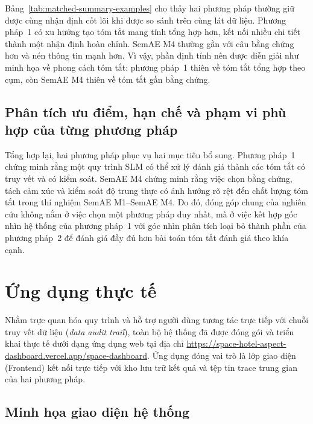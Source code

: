 Bảng~\ref{tab:matched-summary-examples} cho thấy hai phương pháp thường giữ được cùng nhận định cốt lõi khi được so sánh trên cùng lát dữ liệu. Phương pháp~1 có xu hướng tạo tóm tắt mang tính tổng hợp hơn, kết nối nhiều chi tiết thành một nhận định hoàn chỉnh. SemAE M4 thường gần với câu bằng chứng hơn và nén thông tin mạnh hơn. Vì vậy, phần định tính nên được diễn giải như minh họa về phong cách tóm tắt: phương pháp~1 thiên về tóm tắt tổng hợp theo cụm, còn SemAE M4 thiên về tóm tắt gần bằng chứng.

\FloatBarrier

\subsection{Phân tích ưu điểm, hạn chế và phạm vi phù hợp của từng phương pháp}

Tổng hợp lại, hai phương pháp phục vụ hai mục tiêu bổ sung. Phương pháp~1 chứng minh rằng một quy trình SLM có thể xử lý đánh giá thành các tóm tắt có truy vết và có kiểm soát. SemAE M4 chứng minh rằng việc chọn bằng chứng, tách cảm xúc và kiểm soát độ trung thực có ảnh hưởng rõ rệt đến chất lượng tóm tắt trong thí nghiệm SemAE M1--SemAE M4. Do đó, đóng góp chung của nghiên cứu không nằm ở việc chọn một phương pháp duy nhất, mà ở việc kết hợp góc nhìn hệ thống của phương pháp~1 với góc nhìn phân tích loại bỏ thành phần của phương pháp~2 để đánh giá đầy đủ hơn bài toán tóm tắt đánh giá theo khía cạnh.

\section{Ứng dụng thực tế}
\label{sec:web-interface}

Nhằm trực quan hóa quy trình và hỗ trợ người dùng tương tác trực tiếp với chuỗi truy vết dữ liệu (\textit{data audit trail}), toàn bộ hệ thống đã được đóng gói và triển khai thực tế dưới dạng ứng dụng web tại địa chỉ \url{https://space-hotel-aspect-dashboard.vercel.app/space-dashboard}. Ứng dụng đóng vai trò là lớp giao diện (Frontend) kết nối trực tiếp với kho lưu trữ kết quả và tệp tin trace trung gian của hai phương pháp.

\subsection{Minh họa giao diện hệ thống}

